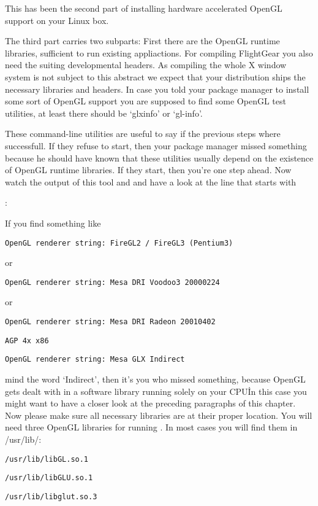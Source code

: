This has been the second part of installing hardware accelerated OpenGL
support on your Linux box.

The third part carries two subparts: First there are the OpenGL runtime
libraries, sufficient to run existing appliactions. For compiling FlightGear you also need the suiting developmental headers.
As compiling the whole X window system is not subject to this abstract we
expect that your distribution ships the necessary libraries and headers. In
case you told your package manager to install some sort of OpenGL support
you are supposed to find some OpenGL test utilities, at least there should
be `glxinfo' or `gl-info'.

These command-line utilities are useful to say if the previous steps where
successfull. If they refuse to start, then your package manager missed
something because he should have known that these utilities usually depend
on the existence of OpenGL runtime libraries. If they start, then you're one
step ahead. Now watch the output of this tool and and have a look at the
line that starts with

:

If you find something like
\medskip

  \texttt{OpenGL renderer string: FireGL2 / FireGL3 (Pentium3)}
  \medskip

\noindent
or
\medskip

  \texttt{OpenGL renderer string: Mesa DRI Voodoo3 20000224}
  \medskip

\noindent
or
\medskip

  \texttt{OpenGL renderer string: Mesa DRI Radeon 20010402}
    
  \texttt{AGP 4x x86}
  \medskip

  \texttt{OpenGL renderer string: Mesa GLX Indirect}
  \medskip

\noindent
mind the word `Indirect', then it's you who missed something, because OpenGL
gets dealt with in a software library running solely on your CPU\. In this
case you might want to have a closer look at the preceding paragraphs of
this chapter. Now please make sure all necessary libraries are at their
proper location.
You will need three OpenGL libraries for running \FlightGear{}. In most cases
you will find them in /usr/lib/:

\texttt{/usr/lib/libGL.so.1}

\texttt{/usr/lib/libGLU.so.1}

\texttt{/usr/lib/libglut.so.3}

